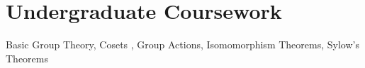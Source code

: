 \documentclass[]{deedy-resume-openfont}
\begin{document}
\begin{minipage}[t]{0.55\textwidth}




\section{Undergraduate Coursework}
\small Basic Group Theory, Cosets , Group Actions, Isomomorphism Theorems, Sylow's Theorems 
\sectionsep


\end{minipage}
\end{document}
